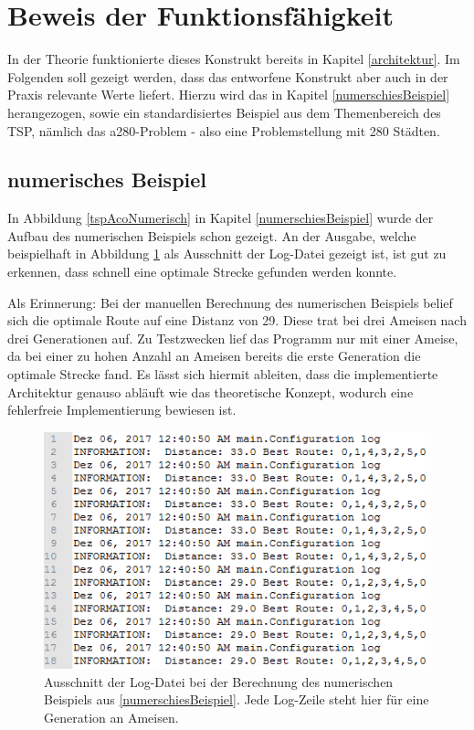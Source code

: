 \section{Beweis der Funktionsfähigkeit}
In der Theorie funktionierte dieses Konstrukt bereits in Kapitel \ref{architektur}. Im Folgenden soll gezeigt werden, dass das entworfene Konstrukt aber auch in der Praxis relevante Werte liefert. Hierzu wird das in Kapitel \ref{numerschiesBeispiel} herangezogen, sowie ein standardisiertes Beispiel aus dem Themenbereich des \ac{TSP}, nämlich das a280-Problem - also eine Problemstellung mit 280 Städten.

\subsection{numerisches Beispiel}
In Abbildung \ref{tspAcoNumerisch} in Kapitel \ref{numerschiesBeispiel} wurde der Aufbau des numerischen Beispiels schon gezeigt. An der Ausgabe, welche beispielhaft in Abbildung \ref{numerischBeweis} als Ausschnitt der Log-Datei gezeigt ist, ist gut zu erkennen, dass schnell eine optimale Strecke gefunden werden konnte. 

Als Erinnerung: Bei der manuellen Berechnung des numerischen Beispiels belief sich die optimale Route auf eine Distanz von 29. Diese trat bei drei Ameisen nach drei Generationen auf. Zu Testzwecken lief das Programm nur mit einer Ameise, da bei einer zu hohen Anzahl an Ameisen bereits die erste Generation die optimale Strecke fand. Es lässt sich hiermit ableiten, dass die implementierte Architektur genauso abläuft wie das theoretische Konzept, wodurch eine fehlerfreie Implementierung bewiesen ist.

\begin{figure}[H]
	\centering
	\includegraphics[width=0.6\linewidth]{images/numerischErgebnis.png}
	\caption{Ausschnitt der Log-Datei bei der Berechnung des numerischen Beispiels aus \ref{numerschiesBeispiel}. Jede Log-Zeile steht hier für eine Generation an Ameisen.}
	\label{numerischBeweis}
\end{figure}



